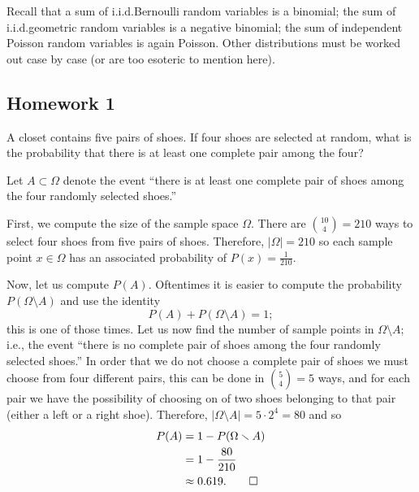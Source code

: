 Recall that a sum of i.i.d.\@ Bernoulli random variables is a binomial; the
sum of i.i.d.\@ geometric random variables is a negative binomial; the sum
of independent Poisson random variables is again Poisson. Other
distributions must be worked out case by case (or are too esoteric to
mention here).

\subsection{Homework 1}
\begin{problem}[Handout 1, \# 5]
  A closet contains five pairs of shoes. If four shoes are selected at
  random, what is the probability that there is at least one complete pair
  among the four?
\end{problem}
\begin{solution*}
  Let \(A\subset\Omega\) denote the event ``there is at least one complete
  pair of shoes among the four randomly selected shoes.''

  First, we compute the size of the sample space \(\Omega\). There are
  \(\binom{10}{4}=210\) ways to select four shoes from five pairs of
  shoes. Therefore, \(|\Omega|=210\) so each sample point \(x\in\Omega\)
  has an associated probability of \(P(x)=\frac{1}{210}\).

  Now, let us compute \(P(A)\). Oftentimes it is easier to compute the
  probability \(P(\Omega\setminus A)\) and use the identity
  \[
    P(A)+P(\Omega\setminus A)=1;
  \]
  this is one of those times. Let us now find the number of sample points
  in \(\Omega\setminus A\); i.e., the event ``there is no complete pair of
  shoes among the four randomly selected shoes.'' In order that we do not
  choose a complete pair of shoes we must choose from four different pairs,
  this can be done in \(\binom{5}{4}=5\) ways, and for each pair we have
  the possibility of choosing on of two shoes belonging to that pair
  (either a left or a right shoe). Therefore,
  \(|\Omega\setminus A|=5\cdot 2^4=80\) and so
  \begin{align*}
    P(A)
    &=1-P(\Omega\setminus A)\\
    &=1-\frac{80}{210}\\
    &\approx0.619.\qedhere
  \end{align*}
\end{solution*}

